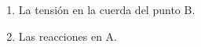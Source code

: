 \documentclass[12pt, twoside]{article}
\begin{document}
\begin{enumerate}
\begin{enumerate}
			\item La tensión en la cuerda del punto B.

			\item Las reacciones en A.
		\end{enumerate}
\end{enumerate}
\end{document}
